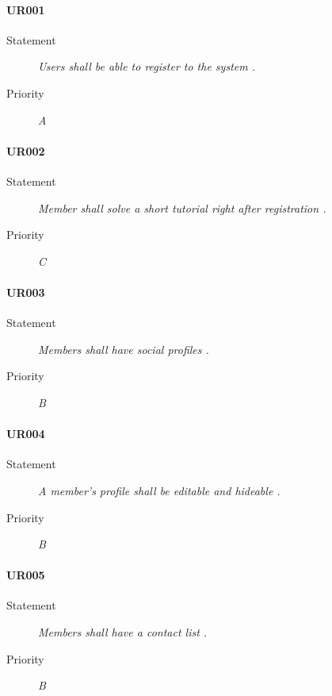 \paragraph{UR001}
  \begin{description}
  \item [Statement] 
    \textit{ Users shall be able to register to the system
    .}
  \item [Priority] \textit{A}
\end{description}
    
\paragraph{UR002}
  \begin{description}
  \item [Statement] 
    \textit{ Member shall solve a short tutorial right after registration
    .}
  \item [Priority] \textit{C}
\end{description}

\paragraph{UR003}
  \begin{description}
  \item [Statement] 
    \textit{ Members shall have social profiles
    .}
  \item [Priority] \textit{B}
\end{description}

\paragraph{UR004}
  \begin{description}
  \item [Statement] 
    \textit{ A member's profile shall be editable and hideable
    .}
  \item [Priority] \textit{B}
\end{description}

\paragraph{UR005}
  \begin{description}
  \item [Statement] 
    \textit{ Members shall have a contact list
    .}
  \item [Priority] \textit{B}
\end{description}

